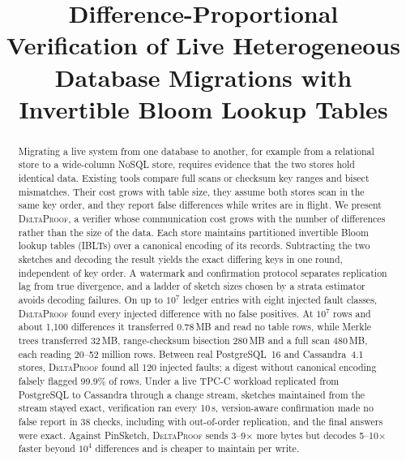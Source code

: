 \documentclass[conference]{IEEEtran}
\newcommand{\sys}{\textsc{DeltaProof}}
\begin{document}
\title{Difference-Proportional Verification of Live Heterogeneous Database Migrations with Invertible Bloom Lookup Tables}

\author{
\and
{}
\and
{}
}

\maketitle

\begin{abstract}
Migrating a live system from one database to another, for example from a relational store to a wide-column NoSQL store, requires evidence that the two stores hold identical data. Existing tools compare full scans or checksum key ranges and bisect mismatches. Their cost grows with table size, they assume both stores scan in the same key order, and they report false differences while writes are in flight. We present \sys{}, a verifier whose communication cost grows with the number of differences rather than the size of the data. Each store maintains partitioned invertible Bloom lookup tables (IBLTs) over a canonical encoding of its records. Subtracting the two sketches and decoding the result yields the exact differing keys in one round, independent of key order. A watermark and confirmation protocol separates replication lag from true divergence, and a ladder of sketch sizes chosen by a strata estimator avoids decoding failures. On up to $10^7$ ledger entries with eight injected fault classes, \sys{} found every injected difference with no false positives. At $10^7$ rows and about 1{,}100 differences it transferred 0.78\,MB and read no table rows, while Merkle trees transferred 32\,MB, range-checksum bisection 280\,MB and a full scan 480\,MB, each reading 20--52 million rows. Between real PostgreSQL~16 and Cassandra~4.1 stores, \sys{} found all 120 injected faults; a digest without canonical encoding falsely flagged 99.9\% of rows. Under a live TPC-C workload replicated from PostgreSQL to Cassandra through a change stream, sketches maintained from the stream stayed exact, verification ran every 10\,s, version-aware confirmation made no false report in 38 checks, including with out-of-order replication, and the final answers were exact. Against PinSketch, \sys{} sends 3--9$\times$ more bytes but decodes 5--10$\times$ faster beyond $10^4$ differences and is cheaper to maintain per write.
\end{abstract}
\end{document}
